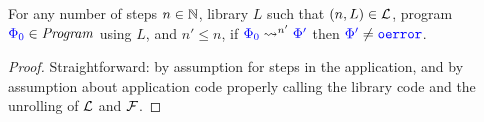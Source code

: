 \begin{theorem} \label{thm:appendix:lr:adequacy}
  For any number of steps $n \in \mathbb{N}$, library $L$ such that $(n, L) \in
  \mathcal{L}$, program ${\color{blue}{\Phi_0}} \in \mathit{Program}$ using $L$, and $n' \leq n$, if
  ${\color{blue}{\Phi_0}} \mathrel{\mathrel{\leadsto}^{n'}} {\color{blue}{\Phi'}}$ then ${\color{blue}{\Phi'}} \neq {\color{blue}{\mathtt{oerror}}}$.
\end{theorem}
\begin{proof}
  Straightforward: by assumption for steps in the application, and by assumption about
  application code properly calling the library code and the unrolling of $\mathcal{L}$ and
  $\mathcal{F}$.
\end{proof}